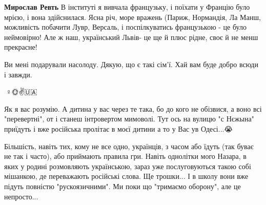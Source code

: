 \begin{itemize}
\begin{itemize}
 
\textbf{Мирослав Ревть} В інституті я вивчала французьку, і поїхати у Францію було мрією, і вона здійснилася. Ясна річ, море вражень (Париж, Нормандія, Ла Манш, можливість побачити Лувр, Версаль, і поспілкуватись французькою - це було неймовірно! Але ж наш, український Львів- це ще й плюс рідне, своє й не менш прекрасне!
\end{itemize}

 
Ви мені подарували насолоду. Дякую, що є такі сім'ї. Хай вам буде добро всюди і завжди.

 
🙋♀️🌞✌🇺🇦

 

Як я вас розумію. А дитина у вас через те така, бо до кого не обізвися, а воно
всі "перевертні", от і станеш інтровертом мимоволі. Тут ось на вулицю "с
Нєжына" приїдуть і вже російська пролітає в моєї дитини а то у Вас ув
Одесі...😭

\begin{itemize}
 

Більшість, навіть тих, кому не все одно, українців, з часом або їдуть (так
буває не так і часто), або приймають правила гри. Навіть однолітки мого Назара,
в яких у родині розмовляють українською, зараз уже послуговуються такою собі
мішанкою, де переважають російські слова. Ще трошки... І в школу вони вже
підуть повністю "рускоязичними". Ми поки що "тримаємо оборону", але це
непросто...



\end{itemize}
\end{itemize}
